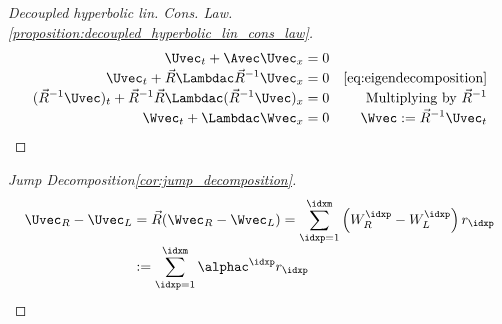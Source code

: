 \begin{proofbox}\nospacing
    \begin{proof}[Decoupled hyperbolic lin. Cons. Law.\cref{proposition:decoupled_hyperbolic_lin_cons_law}]\label{proof:proposition:decoupled_hyperbolic_lin_cons_law}
        \begin{align*}
          \Uvec_{t}+\Avec\Uvec_{x}=0&& \\[-1\jot]
          \Uvec_{t}+\vec{R}\Lambdac\vec{R}^{-1}\Uvec_{x}=0&&\Cref{eq:eigendecomposition}\\[-1\jot]
          (\vec{R}^{-1}\Uvec)_{t}+\vec{R}^{-1}\vec{R}\Lambdac(\vec{R}^{-1}\Uvec)_{x}=0&&\text{Multiplying by $\vec{R}^{-1}$}\\[-1\jot]
          \Wvec_{t}+\Lambdac\Wvec_{x}=0&&\Wvec:=\vec{R}^{-1}\Uvec_{t}
        \end{align*}
    \end{proof}
\end{proofbox}
\begin{proofbox}\nospacing
    \begin{proof}[Jump Decomposition\cref{cor:jump_decomposition}]\label{proof:cor:jump_decomposition}
        \begin{align*}
          \Uvec_{R}-\Uvec_{L}&=\vec{R}(\Wvec_{R}-\Wvec_{L})=\sum_{\idxp=1}^{\idxm}\left(W_{R}^{\idxp}-W_{L}^{\idxp}\right)r_{\idxp}\nonumber\\[-1\jot]
          &:=\sum_{\idxp=1}^{\idxm}\alphac^{\idxp}r_{\idxp}
        \end{align*}
    \end{proof}
\end{proofbox}
